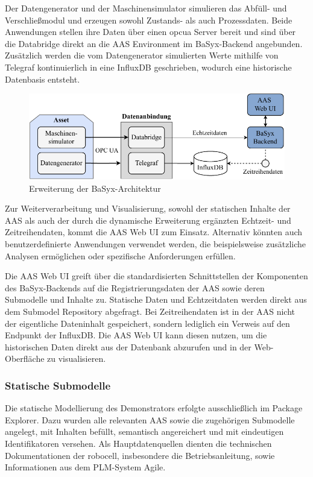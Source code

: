 Der Datengenerator und der Maschinensimulator simulieren das Abfüll- und Verschließmodul und erzeugen sowohl Zustands- als auch Prozessdaten. 
Beide Anwendungen stellen ihre Daten über einen \acs{opcua} Server bereit und sind über die Databridge direkt an die AAS Environment im BaSyx-Backend angebunden.
Zusätzlich werden die vom 
\linebreak
Datengenerator simulierten Werte mithilfe von Telegraf kontinuierlich in eine InfluxDB geschrieben, wodurch eine historische Datenbasis entsteht. 

\newpage
\begin{figure}[htbp]
    \centering
        \includegraphics[width=1\textwidth]{Bilder/Ergebnisse/Systemarchitektur/DynamischeErwweiterungNeu.pdf}
    \caption{Erweiterung der BaSyx-Architektur}
    \label{fig:DynamischeErweiterungArchitektur}
\end{figure}

Zur Weiterverarbeitung und Visualisierung, sowohl der statischen Inhalte der AAS als auch der durch die dynamische Erweiterung ergänzten Echtzeit- und Zeitreihendaten, kommt die AAS Web UI zum Einsatz. 
Alternativ könnten auch benutzerdefinierte Anwendungen verwendet werden, die beispielsweise zusätzliche Analysen ermöglichen oder spezifische Anforderungen erfüllen.

Die AAS Web UI greift über die standardisierten Schnittstellen der Komponenten des BaSyx-Backends auf die Registrierungsdaten der AAS sowie deren Submodelle und Inhalte zu. 
Statische Daten und Echtzeitdaten werden direkt aus dem Submodel Repository abgefragt. 
Bei Zeitreihendaten ist in der AAS nicht der eigentliche Dateninhalt gespeichert, sondern lediglich ein Verweis auf den Endpunkt der InfluxDB.
Die AAS Web UI kann diesen nutzen, um die historischen Daten direkt aus der Datenbank abzurufen und in der Web-Oberfläche zu visualisieren.

\subsubsection{Statische Submodelle}
Die statische Modellierung des Demonstrators erfolgte ausschließlich im Package Explorer.
Dazu wurden alle relevanten AAS sowie die zugehörigen Submodelle angelegt, mit Inhalten befüllt, semantisch angereichert und mit eindeutigen Identifikatoren versehen.
Als Hauptdatenquellen dienten die technischen Dokumentationen der robocell, insbesondere die Betriebsanleitung, sowie Informationen aus dem PLM-System Agile.

